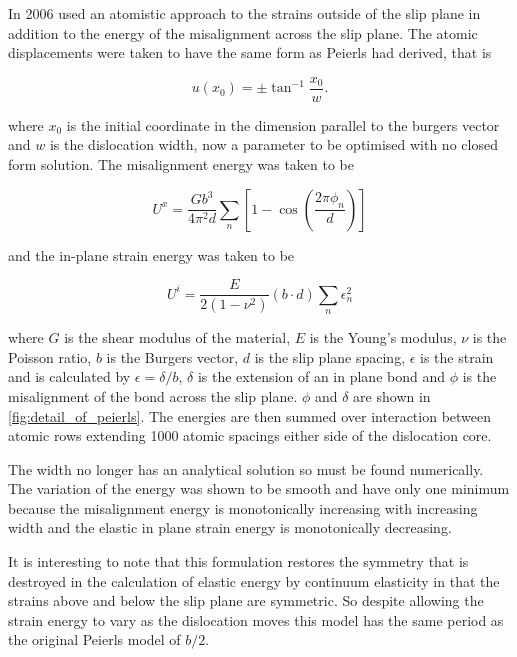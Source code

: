 In 2006 \citet{Clegg2006} used an atomistic approach to the strains outside of the slip plane in addition to the energy of the misalignment across the slip plane. The atomic displacements were taken to have the same form as Peierls had derived, that is

\begin{equation}
u(x_0) = \pm \tan^{-1}\frac{x_0}{w}.
\end{equation}

where $x_0$ is the initial coordinate in the dimension parallel to the burgers vector and $w$ is the dislocation width, now a parameter to be optimised with no closed form solution. The misalignment energy was taken to be

\begin{equation}
U^{x} = \frac{Gb^3}{4\pi^2 d} \sum_n \left[ 1 - \cos \left(\frac{2\pi \phi_n}{d} \right)\right]
\end{equation}
 
 and the in-plane strain energy was taken to be 
 
 \begin{equation}
 U^i = \frac{E}{2(1-\nu^2)} (b\cdot d) \sum_n \epsilon_n^2
 \end{equation}

where $G$ is the shear modulus of the material, $E$ is the Young's modulus, $\nu$ is the Poisson ratio, $b$ is the Burgers vector, $d$ is the slip plane spacing, $\epsilon$ is the strain and is calculated by $\epsilon = \delta/b$, $\delta$ is the extension of an in plane bond and $\phi$ is the misalignment of the bond across the slip plane. $\phi$ and $\delta$ are shown in \autoref{fig:detail_of_peierls}. The energies are then summed over interaction between atomic rows extending 1000 atomic spacings either side of the dislocation core.

The width no longer has an analytical solution so must be found numerically. The variation of the energy was shown to be smooth and have only one minimum because the misalignment energy is monotonically increasing with increasing width and the elastic in plane strain energy is monotonically decreasing.

It is interesting to note that this formulation restores the symmetry that is destroyed in the calculation of elastic energy by continuum elasticity in that the strains above and below the slip plane are symmetric. So despite allowing the strain energy to vary as the dislocation moves this model has the same period as the original Peierls model of $b/2$.


